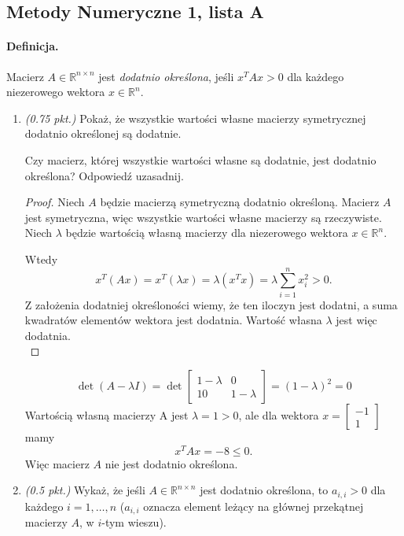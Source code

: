 \documentclass[12pt]{article}
\newcommand{\R}{\mathbb{R}}
\newenvironment{lista}[2][]{\newpage
\begin{center}
    \section[Lista \textbf{#2}]{Metody Numeryczne 1, lista #2}
\end{center}
\bigskip
#1
\begin{enumerate}[label=\textbf{#2\arabic*.}]}{\end{enumerate}}
\newcommand{\zad}[1][0.5]{\item \emph{(#1 pkt.) }}
\begin{document}
\begin{lista}[\paragraph*{Definicja.} Macierz $A\in\R^{n\times n}$ jest \emph{dodatnio określona}, jeśli $x^TAx>0$ dla każdego niezerowego wektora $x\in\R^n$.]{A}
    \zad[0.75] Pokaż, że wszystkie wartości własne macierzy symetrycznej dodatnio określonej są dodatnie.

    Czy macierz, której wszystkie wartości własne są dodatnie, jest dodatnio określona? Odpowiedź uzasadnij.

    \begin{mdframed}
        \begin{proof}
            Niech $A$ będzie macierzą symetryczną dodatnio określoną. Macierz $A$ jest symetryczna, więc wszystkie wartości własne macierzy są rzeczywiste. \\ Niech $\lambda$ będzie wartością własną macierzy dla niezerowego wektora $x\in\R^n$.

            Wtedy
            \[ x^T(Ax) = x^T(\lambda x) = \lambda(x^Tx) = \lambda \sum_{i=1}^n x_i^2 > 0. \]
            Z założenia dodatniej określoności wiemy, że ten iloczyn jest dodatni, a suma kwadratów elementów wektora jest dodatnia. Wartość własna $\lambda$ jest więc dodatnia. \qedhere \\
        \end{proof}


        \[ \det(A-\lambda I) = \det \begin{bmatrix} 1 - \lambda & 0 \\ 10 & 1 - \lambda \end{bmatrix} = (1-\lambda)^2 = 0 \]
        Wartością własną macierzy A jest $\lambda = 1 > 0$, ale dla wektora $x = \begin{bmatrix} -1 \\ 1 \end{bmatrix}$ mamy
        \[ x^TAx = -8 \leq 0. \]
        Więc macierz $A$ nie jest dodatnio określona.
    \end{mdframed}

    \zad\label{A3} Wykaż, że jeśli $A\in\R^{n\times n}$ jest dodatnio określona, to $a_{i,i} > 0$ dla każdego $i = 1,\dots,n$ ($a_{i,i}$ oznacza element leżący na głównej przekątnej macierzy $A$, w $i$-tym wieszu).


\end{lista}
\end{document}
